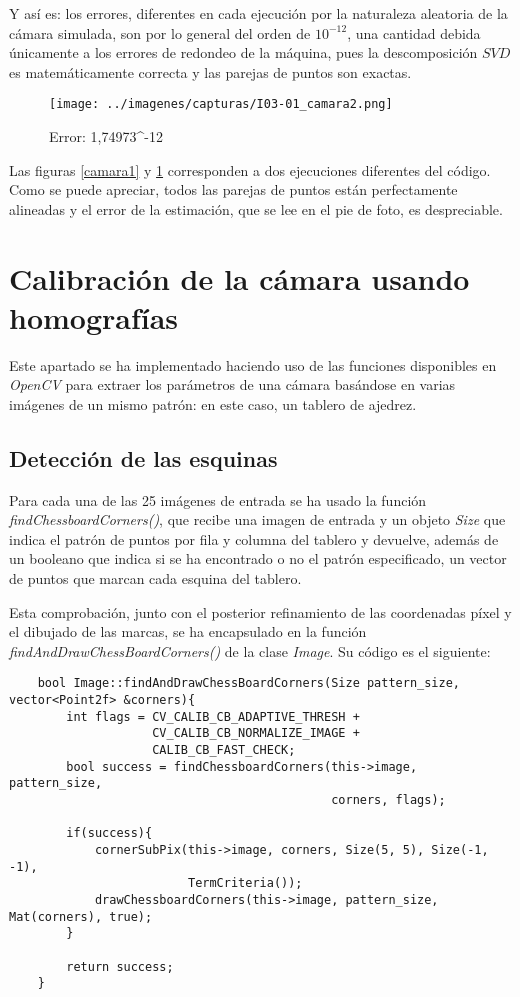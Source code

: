 \documentclass[a4paper, 11pt]{article}
\theoremstyle{definition}
\theoremstyle{theorem}
\begin{document}
    Y así es: los errores, diferentes en cada ejecución por la naturaleza aleatoria de la cámara simulada, son por lo general del orden de $10^{-12}$, una cantidad debida únicamente a los errores de redondeo de la máquina, pues la descomposición $SVD$ es matemáticamente correcta y las parejas de puntos son exactas.

    \begin{figure}[htb!]
        \centering
        \texttt{[image: ../imagenes/capturas/I03-01\_camara2.png]}
        \caption{Error:  1,74973^{-12} \label{camara2}}
    \end{figure}

    Las figuras \ref{camara1} y \ref{camara2} corresponden a dos ejecuciones diferentes del código. Como se puede apreciar, todos las parejas de puntos están perfectamente alineadas y el error de la estimación, que se lee en el pie de foto, es despreciable.


    \section{Calibración de la cámara usando homografías}


    Este apartado se ha implementado haciendo uso de las funciones disponibles en \emph{OpenCV} para extraer los parámetros de una cámara basándose en varias imágenes de un mismo patrón: en este caso, un tablero de ajedrez.

    \subsection{Detección de las esquinas}
    Para cada una de las 25 imágenes de entrada se ha usado la función \emph{findChessboardCorners()}, que recibe una imagen de entrada y un objeto \emph{Size} que indica el patrón de puntos por fila y columna del tablero y devuelve, además de un booleano que indica si se ha encontrado o no el patrón especificado, un vector de puntos que marcan cada esquina del tablero.

    Esta comprobación, junto con el posterior refinamiento de las coordenadas píxel y el dibujado de las marcas, se ha encapsulado en la función \emph{findAndDrawChessBoardCorners()} de la clase \emph{Image}. Su código es el siguiente:

    \begin{lstlisting}
    bool Image::findAndDrawChessBoardCorners(Size pattern_size, vector<Point2f> &corners){
        int flags = CV_CALIB_CB_ADAPTIVE_THRESH +
                    CV_CALIB_CB_NORMALIZE_IMAGE +
                    CALIB_CB_FAST_CHECK;
        bool success = findChessboardCorners(this->image, pattern_size,
                                             corners, flags);

        if(success){
            cornerSubPix(this->image, corners, Size(5, 5), Size(-1, -1),
                         TermCriteria());
            drawChessboardCorners(this->image, pattern_size, Mat(corners), true);
        }

        return success;
    }
    \end{lstlisting}
\end{document}
